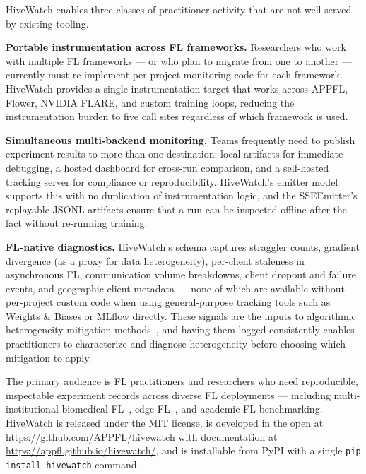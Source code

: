 HiveWatch enables three classes of practitioner activity that are not well served by existing tooling.

\textbf{Portable instrumentation across FL frameworks.} Researchers who work with multiple FL frameworks — or who plan to migrate from one to another — currently must re-implement per-project monitoring code for each framework. HiveWatch provides a single instrumentation target that works across APPFL, Flower, NVIDIA FLARE, and custom training loops, reducing the instrumentation burden to five call sites regardless of which framework is used.

\textbf{Simultaneous multi-backend monitoring.} Teams frequently need to publish experiment results to more than one destination: local artifacts for immediate debugging, a hosted dashboard for cross-run comparison, and a self-hosted tracking server for compliance or reproducibility. HiveWatch's emitter model supports this with no duplication of instrumentation logic, and the SSEEmitter's replayable JSONL artifacts ensure that a run can be inspected offline after the fact without re-running training.

\textbf{FL-native diagnostics.} HiveWatch's schema captures straggler counts, gradient divergence (as a proxy for data heterogeneity), per-client staleness in asynchronous FL, communication volume breakdowns, client dropout and failure events, and geographic client metadata — none of which are available without per-project custom code when using general-purpose tracking tools such as Weights \& Biases or MLflow directly. These signals are the inputs to algorithmic heterogeneity-mitigation methods~\cite{lai2021oort,li2024fedcompass,xie2019asynchronous}, and having them logged consistently enables practitioners to characterize and diagnose heterogeneity before choosing which mitigation to apply.

The primary audience is FL practitioners and researchers who need reproducible, inspectable experiment records across diverse FL deployments — including multi-institutional biomedical FL~\cite{rieke2020future}, edge FL~\cite{lim2020federated}, and academic FL benchmarking. HiveWatch is released under the MIT license, is developed in the open at \url{https://github.com/APPFL/hivewatch} with documentation at \url{https://appfl.github.io/hivewatch/}, and is installable from PyPI with a single \texttt{pip install hivewatch} command.
